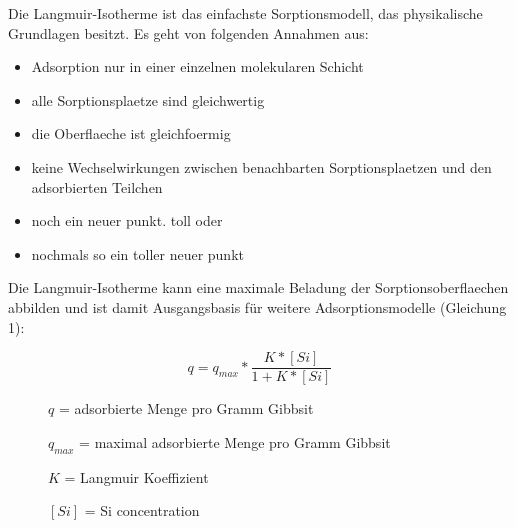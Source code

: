 Die Langmuir-Isotherme ist das einfachste Sorptionsmodell, das physikalische Grundlagen besitzt. 
Es geht von folgenden Annahmen aus:


\begin{itemize}
\item Adsorption nur in einer einzelnen molekularen Schicht
\item alle Sorptionsplaetze sind gleichwertig
\item die Oberflaeche ist gleichfoermig 
\item keine Wechselwirkungen zwischen benachbarten Sorptionsplaetzen und den adsorbierten Teilchen
\item noch ein neuer punkt. toll oder 
\item nochmals so ein toller neuer punkt
\end{itemize}


Die Langmuir-Isotherme kann eine maximale Beladung der Sorptionsoberflaechen abbilden und ist damit Ausgangsbasis für weitere Adsorptionsmodelle (Gleichung 1):


\begin{equation}
q=q_{max}*\frac{K*[Si]}{1+K*[Si]}
\end{equation}


\begin{description}
\item[ ] $q$ = adsorbierte Menge pro Gramm Gibbsit
\item[ ] $q_{max}$ = maximal adsorbierte Menge pro Gramm Gibbsit
\item[ ]$K$ = Langmuir Koeffizient	
\item[ ]$[Si]$ = Si concentration
\end{description}

